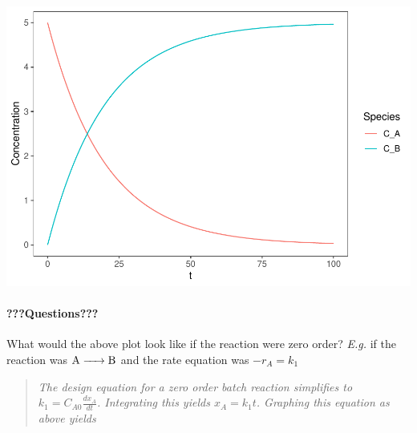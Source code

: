 \documentclass[
]{article}
\begin{document}
\includegraphics{Bioprocess_Engineering_files/figure-latex/unnamed-chunk-10-1.pdf}

\hypertarget{questions-4}{%
\paragraph{???Questions???}\label{questions-4}}

What would the above plot look like if the reaction were zero order? \emph{E.g.} if the reaction was \(\ce{ A -> B }\) and the rate equation was \(-r_A = k_1\)

\begin{quote}
\emph{The design equation for a zero order batch reaction simplifies to \(k_1 = C_{A0} \frac{dx_A}{dt}\). Integrating this yields \(x_A = k_1t\). Graphing this equation as above yields }
\end{quote}
\end{document}
